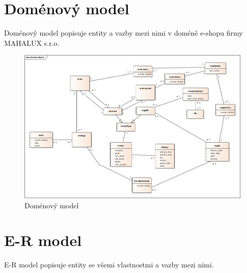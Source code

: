 \documentclass[thesis=B,czech]{FITthesis}[2012/06/26]
\begin{document}
\section{Doménový model}
	Doménový model popisuje entity a vazby mezi nimi v doméně e-shopu firmy MAHALUX s.r.o.
	
\begin{figure}[H]
	\includegraphics[height=\textwidth, angle=90]{domain_model.png}
	\caption{Doménový model}\label{domain_model}
\end{figure}

\section{E-R model}
E-R model popisuje entity se všemi vlastnostmi a vazby mezi nimi.
\end{document}
